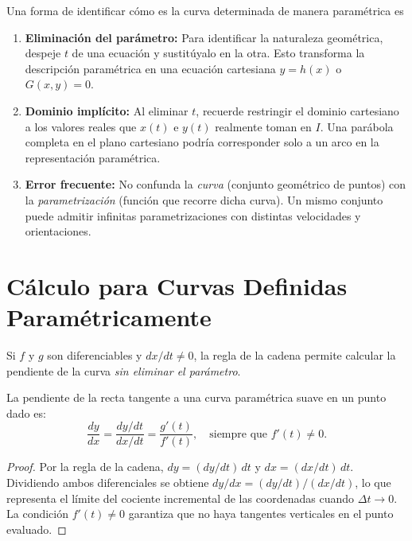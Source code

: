 \begin{rem} Una forma de identificar cómo es la curva determinada de manera paramétrica es
\begin{enumerate} 
  \item \textbf{Eliminación del parámetro:} Para identificar la naturaleza geométrica,
    despeje $t$ de una ecuación y sustitúyalo en la otra. Esto transforma la
    descripción paramétrica en una ecuación cartesiana $y = h(x)$ o
    $G(x,y) = 0$.
  \item \textbf{Dominio implícito:} Al eliminar $t$, recuerde restringir el dominio
    cartesiano a los valores reales que $x(t)$ e $y(t)$ realmente toman en
    $I$. Una parábola completa en el plano cartesiano podría corresponder
    solo a un arco en la representación paramétrica.
  \item \textbf{Error frecuente:} No confunda la \emph{curva} (conjunto geométrico de
    puntos) con la \emph{parametrización} (función que recorre dicha curva).
    Un mismo conjunto puede admitir infinitas parametrizaciones con distintas
    velocidades y orientaciones.
\end{enumerate}
\end{rem}

\section{Cálculo para Curvas Definidas Paramétricamente}

Si $f$ y $g$ son diferenciables y $dx/dt \neq 0$, la regla de la cadena
permite calcular la pendiente de la curva \emph{sin eliminar el parámetro}.

\begin{theorem}

La pendiente de la recta tangente a una curva paramétrica suave en un punto
dado es:
\[
  \frac{dy}{dx} = \frac{dy/dt}{dx/dt} = \frac{g'(t)}{f'(t)},
  \quad \text{siempre que } f'(t) \neq 0.
\]
\begin{proof}
Por la regla de la cadena, $dy = (dy/dt)\,dt$ y $dx = (dx/dt)\,dt$.
Dividiendo ambos diferenciales se obtiene
$dy/dx = (dy/dt)/(dx/dt)$, lo que representa el límite del cociente
incremental de las coordenadas cuando $\Delta t \to 0$. La condición
$f'(t) \neq 0$ garantiza que no haya tangentes verticales en el punto
evaluado.
\end{proof}
\end{theorem}

